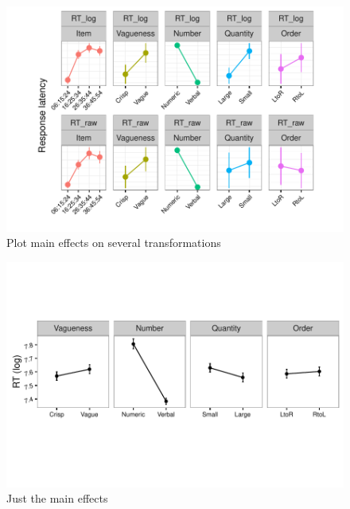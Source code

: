 \documentclass[a4paper,12pt]{article}\usepackage[]{graphicx}\usepackage[]{color}
\makeatletter
\def\maxwidth{ %
  \ifdim\Gin@nat@width>\linewidth
    \linewidth
  \else
    \Gin@nat@width
  \fi
}
\newenvironment{knitrout}{}{} %
\makeatother
\begin{document}
\clearpage

\begin{knitrout}\scriptsize
{}\color{fgcolor}\begin{figure}[hbtp]

{\centering \includegraphics[width=\maxwidth]{figure/graphics-plotMainsa-1} 

}

\caption[Plot main effects on several transformations]{Plot main effects on several transformations}\label{fig:plotMainsa}
\end{figure}


\end{knitrout}

\clearpage

\begin{knitrout}\scriptsize
{}\color{fgcolor}\begin{figure}[hbtp]

{\centering \includegraphics[width=\maxwidth]{figure/graphics-mainB-1} 

}

\caption[Just the main effects]{Just the main effects}\label{fig:mainB}
\end{figure}


\end{knitrout}
\end{document}
